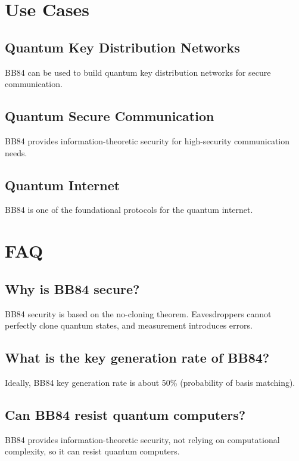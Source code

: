 \documentclass[12pt,a4paper]{article}
\begin{document}
\section{Use Cases}

\subsection{Quantum Key Distribution Networks}

BB84 can be used to build quantum key distribution networks for secure communication.

\subsection{Quantum Secure Communication}

BB84 provides information-theoretic security for high-security communication needs.

\subsection{Quantum Internet}

BB84 is one of the foundational protocols for the quantum internet.

\section{FAQ}

\subsection{Why is BB84 secure?}

BB84 security is based on the no-cloning theorem. Eavesdroppers cannot perfectly clone quantum states, and measurement introduces errors.

\subsection{What is the key generation rate of BB84?}

Ideally, BB84 key generation rate is about 50\% (probability of basis matching).

\subsection{Can BB84 resist quantum computers?}

BB84 provides information-theoretic security, not relying on computational complexity, so it can resist quantum computers.
\end{document}
